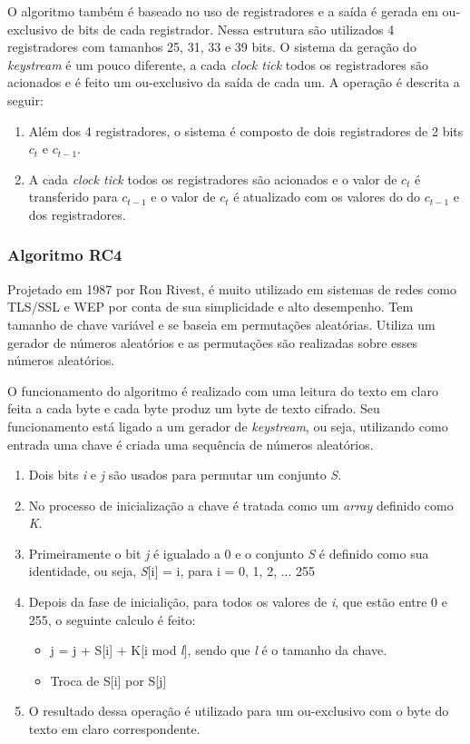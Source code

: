 O algoritmo também é baseado no uso de registradores e a saída é gerada em ou-exclusivo de bits de cada registrador. Nessa estrutura são utilizados 4 registradores com tamanhos 25, 31, 33 e 39 bits. O sistema da geração do \textit{keystream} é um pouco diferente, a cada \textit{clock tick} todos os registradores são acionados e é feito um ou-exclusivo da saída de cada um. A operação é descrita a seguir:

\begin{enumerate}
	\item Além dos 4 registradores, o sistema é composto de dois registradores de 2 bits $c_t$ e $c_{t-1}$.
	\item A cada \textit{clock tick} todos os registradores são acionados e o valor de $ c_t $ é transferido para $ c_{t-1}$ e o valor de $ c_t$ é atualizado com os valores do do $ c_{t-1}$ e dos registradores.
\end{enumerate}

\subsubsection{Algoritmo RC4}
\label{algorithm-rc4}

Projetado em 1987 por Ron Rivest, é muito utilizado em sistemas de redes como TLS/SSL e WEP por conta de sua simplicidade e alto desempenho. Tem tamanho de chave variável e se baseia em permutações aleatórias. Utiliza um gerador de números aleatórios e as permutações são realizadas sobre esses números aleatórios.

O funcionamento do algoritmo é realizado com uma leitura do texto em claro feita a cada byte e cada byte produz um byte de texto cifrado. Seu funcionamento está ligado a um gerador de \textit{keystream}, ou seja, utilizando como entrada uma chave é criada uma sequência de números aleatórios.

\begin{enumerate}
	\item Dois bits \textit{i} e \textit{j} são usados para permutar um conjunto \textit{S}.
	\item No processo de inicialização a chave é tratada como um \textit{array} definido como \textit{K}.
	\item Primeiramente o bit \textit{j} é igualado a 0 e o conjunto \textit{S} é definido como sua identidade, ou seja, \textit{S}[i] = i, para i = 0, 1, 2, ... 255
	\item Depois da fase de inicialição, para todos os valores de \textit{i}, que estão entre 0 e 255, o seguinte calculo é feito:
	\begin{itemize}
		\item j = j + S[i] + K[i mod \textit{l}], sendo que \textit{l} é o tamanho da chave.
		\item Troca de S[i] por S[j]	
	\end{itemize}	 
	\item O resultado dessa operação é utilizado para um ou-exclusivo com o byte do texto em claro correspondente.
\end{enumerate} 

